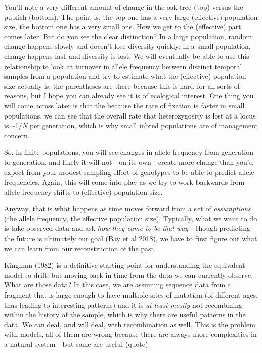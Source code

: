 \documentclass[
]{article}
\begin{document}
You'll note a very different amount of change in the oak tree (top)
versus the pupfish (bottom). The point is, the top one has a very large
(effective) population size, the bottom one has a very small one. How we
get to the (effective) part comes later. But do you see the clear
distinction? In a large population, random change happens slowly and
doesn't lose diversity quickly; in a small population, change happens
fast and diversity is lost. We will eventually be able to use this
relationship to look at turnover in allele frequency between distinct
temporal samples from a population and try to estimate what the
(effective) population size actually is; the parentheses are there
because this is hard for all sorts of reasons, but I hope you can
already see it is of ecological interest. One thing you will come across
later is that the because the rate of fixation is faster in small
populations, we can see that the overall rate that heterozygosity is
lost at a locus is \textasciitilde1/\emph{N} per generation, which is
why small inbred populations are of management concern.

So, in finite populations, you will see changes in allele frequency from
generation to generation, and likely it will not - on its own - create
more change than you'd expect from your modest sampling effort of
genotypes to be able to predict allele frequencies. Again, this will
come into play as we try to work backwards from allele frequency shifts
to (effective) population size.

Anyway, that is what happens as time moves forward from a set of
\emph{assumptions} (the allele frequency, the effective population
size). Typically, what we want to do is take observed data and ask
\emph{how they came to be that way} - though predicting the future is
ultimately our goal (Bay et al 2018), we have to first figure out what
we can learn from our reconstruction of the past.

Kingman (1982) is a definitive starting point for understanding the
equivalent model to drift, but moving back in time from the data we can
currently observe. What are those data? In this case, we are assuming
sequence data from a fragment that is large enough to have multiple
sites of mutation (of different ages, thus leading to interesting
patterns) and it is \emph{at least mostly} not recombining within the
history of the sample, which is why there are useful patterns in the
data. We can deal, and will deal, with recombination as well. This is
the problem with models, all of them are wrong because there are always
more complexities in a natural system - but some are useful (quote).
\end{document}
